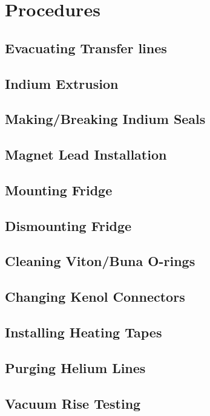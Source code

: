 \chapter{Procedures} 
\label{procedures}  
\section{Evacuating Transfer lines}

\section{Indium Extrusion}

\section{Making/Breaking Indium Seals}

\section{Magnet Lead Installation}

\section{Mounting Fridge}

\section{Dismounting Fridge}

\section{Cleaning Viton/Buna O-rings}

\section{Changing Kenol Connectors}

\section{Installing Heating Tapes}

\section{Purging Helium Lines}

\section{Vacuum Rise Testing}

